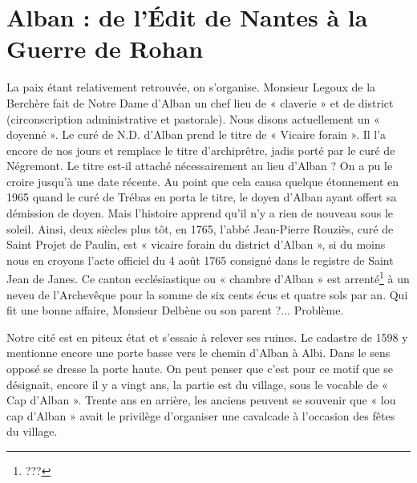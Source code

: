 \section*{Alban : de l'Édit de Nantes à la Guerre de Rohan}

La paix étant relativement retrouvée, on s'organise. Monsieur Legoux de la Berchère fait de Notre Dame d'Alban un chef lieu de « claverie » et de district (circonscription administrative et pastorale). Nous disons actuellement un « doyenné ». Le curé de N.D. d'Alban prend le titre de « Vicaire forain ». Il l'a encore de nos jours et remplace le titre d'archiprêtre, jadis porté par le curé de Négremont. Le titre est-il attaché nécessairement au lieu d'Alban ? On a pu le croire jusqu'à une date récente. Au point que cela causa quelque étonnement en 1965 quand le curé de Trébas en porta le titre, le doyen d'Alban ayant offert sa démission de doyen. Mais l'histoire apprend qu'il n'y a rien de nouveau sous le soleil. Ainsi, deux siècles plus tôt, en 1765, l'abbé Jean-Pierre Rouziès, curé de Saint Projet de Paulin, est « vicaire forain du district d'Alban », si du moins nous en croyons l'acte officiel du 4 août 1765 consigné dans le registre de Saint Jean de Janes. Ce canton ecclésiastique ou « chambre d'Alban » est arrenté\footnote{???} à un neveu de l'Archevêque pour la somme de six cents écus et quatre sols par an. Qui fit une bonne affaire, Monsieur Delbène ou son parent ?... Problème.

Notre cité est en piteux état et s'essaie à relever ses ruines. Le cadastre de 1598 y mentionne encore une porte basse vers le chemin d'Alban à Albi. Dans le sens opposé se dresse la porte haute. On peut penser que c'est pour ce motif que se désignait, encore il y a vingt ans, la partie est du village, sous le vocable de « Cap d'Alban ». Trente ans en arrière, les anciens peuvent se souvenir que « lou cap d'Alban » avait le privilège d'organiser une cavalcade à l'occasion des fêtes du village.